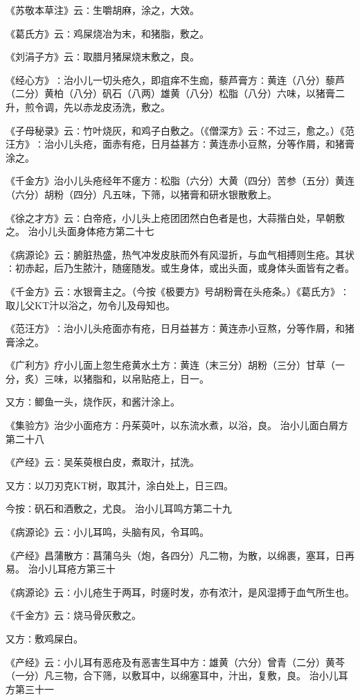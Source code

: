 \documentclass[a4paper,12pt,UTF8,twoside]{ctexbook}
\begin{document}
《苏敬本草注》云∶生嚼胡麻，涂之，大效。

《葛氏方》云∶鸡屎烧冶为末，和猪脂，敷之。

《刘涓子方》云∶取腊月猪屎烧末敷之，良。

《经心方》∶治小儿一切头疮久，即疽痒不生痂，藜芦膏方∶黄连（八分）藜芦（二分）黄柏（八分）矾石（八两）雄黄（八分）松脂（八分）六味，以猪膏二升，煎令调，先以赤龙皮汤洗，敷之。

《子母秘录》云∶竹叶烧灰，和鸡子白敷之。（《僧深方》云∶不过三，愈之。）《范汪方》∶治小儿头疮，面赤有疮，日月益甚方∶黄连赤小豆熬，分等作屑，和猪膏涂之。

《千金方》治小儿头疮经年不瘥方∶松脂（六分）大黄（四分）苦参（五分）黄连（六分）胡粉（四分）凡五味，下筛，以猪膏和研水银散敷上。

《徐之才方》云∶白帝疮，小儿头上疮团团然白色者是也，大蒜揩白处，早朝敷之。
治小儿头面身体疮方第二十七

《病源论》云∶腑脏热盛，热气冲发皮肤而外有风湿折，与血气相搏则生疮。其状∶初赤起，后乃生脓汁，随瘥随发。或生身体，或出头面，或身体头面皆有之者。

《千金方》云∶水银膏主之。（今按《极要方》号胡粉膏在头疮条。）《葛氏方》∶取儿父KT汁以浴之，勿令儿及母知也。

《范汪方》∶治小儿头疮面亦有疮，日月益甚方∶黄连赤小豆熬，分等作屑，和猪膏涂之。

《广利方》疗小儿面上忽生疮黄水土方∶黄连（末三分）胡粉（三分）甘草（一分，炙）三味，以猪脂和，以帛贴疮上，日一。

又方∶鲫鱼一头，烧作灰，和酱汁涂上。

《集验方》治少小面疮方∶丹茱萸叶，以东流水煮，以浴，良。
治小儿面白屑方第二十八

《产经》云∶吴茱萸根白皮，煮取汁，拭洗。

又方∶以刀刃克KT树，取其汁，涂白处上，日三四。

今按∶矾石和酒敷之，尤良。
治小儿耳鸣方第二十九

《病源论》云∶小儿耳鸣，头脑有风，令耳鸣。

《产经》昌蒲散方∶菖蒲乌头（炮，各四分）凡二物，为散，以绵裹，塞耳，日再易。
治小儿耳疮方第三十

《病源论》云∶小儿疮生于两耳，时瘥时发，亦有浓汁，是风湿搏于血气所生也。

《千金方》云∶烧马骨灰敷之。

又方∶敷鸡屎白。

《产经》云∶小儿耳有恶疮及有恶害生耳中方∶雄黄（六分）曾青（二分）黄芩（一分）凡三物，合下筛，以敷耳中，以绵塞耳中，汁出，复敷，良。
治小儿耳方第三十一
\end{document}
